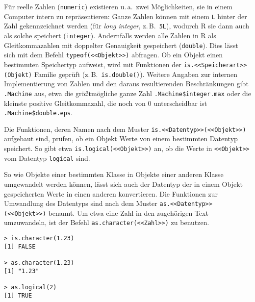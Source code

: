 Für reelle Zahlen (\lstinline!numeric!) existieren u.\,a.\ zwei Möglichkeiten, sie in einem Computer intern zu repräsentieren: Ganze Zahlen können mit einem \lstinline!L! hinter der Zahl gekennzeichnet werden (für \emph{long integer}, z.\,B.\ \lstinline!5L!), wodurch R sie dann auch als solche speichert (\lstinline!integer!). Andernfalls werden alle Zahlen in R als Gleitkommazahlen mit doppelter Genauigkeit gespeichert (\lstinline!double!). Dies lässt sich mit dem Befehl \lstinline!typeof(<<Objekt>>)! abfragen. Ob ein Objekt einen bestimmten Speichertyp aufweist, wird mit Funktionen der \lstinline!is.<<Speicherart>>(Objekt)! Familie geprüft (z.\,B.\ \lstinline!is.double()!). Weitere Angaben zur internen Implementierung von Zahlen und den daraus resultierenden Beschränkungen gibt \lstinline!.Machine! aus, etwa die größtmögliche ganze Zahl \lstinline!.Machine$integer.max! oder die kleinste positive Gleitkommazahl, die noch von $0$ unterscheidbar ist \lstinline!.Machine$double.eps!.

Die Funktionen, deren Namen nach dem Muster \lstinline!is.<<Datentyp>>(<<Objekt>>)! aufgebaut sind, prüfen, ob ein Objekt Werte von einem bestimmten Datentyp speichert. So gibt etwa \lstinline!is.logical(<<Objekt>>)! an, ob die Werte in \lstinline!<<Objekt>>! vom Datentyp \lstinline!logical! sind.

So wie Objekte einer bestimmten Klasse in Objekte einer anderen Klasse umgewandelt werden können, lässt sich auch der Datentyp der in einem Objekt gespeicherten Werte in einen anderen konvertieren. Die Funktionen zur Umwandlung des Datentyps sind nach dem Muster \lstinline!as.<<Datentyp>>(<<Objekt>>)! benannt. Um etwa eine Zahl in den zugehörigen Text umzuwandeln, ist der Befehl \lstinline!as.character(<<Zahl>>)! zu benutzen.
\begin{lstlisting}
> is.character(1.23)
[1] FALSE

> as.character(1.23)
[1] "1.23"

> as.logical(2)
[1] TRUE
\end{lstlisting}

